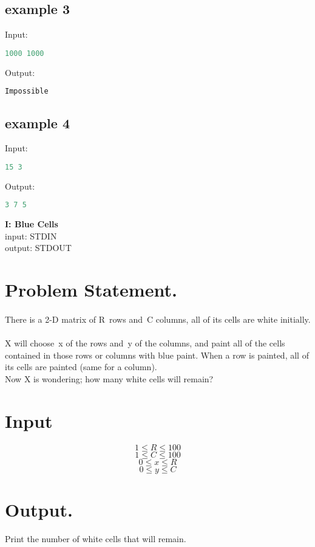 \documentclass[10pt]{article}
\begin{document}
\subsection{example 3}
Input:
\begin{lstlisting}[language=Python]
1000 1000
\end{lstlisting}
Output:
\begin{lstlisting}[language=Python]
Impossible
\end{lstlisting}
\subsection{example 4}
Input:
\begin{lstlisting}[language=Python]
15 3
\end{lstlisting}
Output:
\begin{lstlisting}[language=Python]
3 7 5
\end{lstlisting}



\newpage
\begin{center}
    \Huge { \textbf{I: Blue Cells}}\\
\normalsize  { input:  STDIN}\\
\normalsize{    output: STDOUT}
\end{center}
\section{Problem Statement.}
\paragraph{}
There is a 2-D matrix of R rows and C columns, all of its cells are white initially.
\paragraph{}
X will choose x of the rows and y of the columns, and paint all of the cells contained in those rows or columns with blue paint. When a row is painted, all of its cells are painted (same for a column).\\
Now X is wondering; how many white cells will remain?
\section{Input}
$$ 1\le R \le 100 $$
$$ 1\le C \le 100 $$
$$ 0\le x \le R $$
$$ 0\le y \le C $$
\section{Output.}
Print the number of white cells that will remain.
\end{document}
